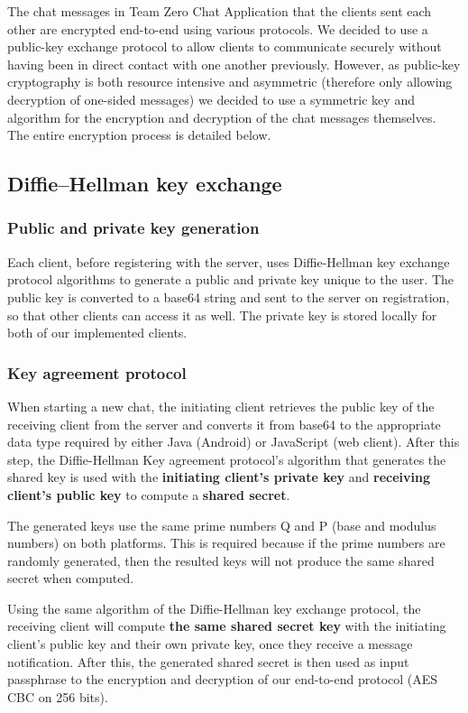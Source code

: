 The chat messages in Team Zero Chat Application that the clients sent each other are encrypted end-to-end using various protocols. We decided to use a public-key exchange protocol to allow clients to communicate securely without having been in direct contact with one another previously. However, as public-key cryptography is both resource intensive and asymmetric (therefore only allowing decryption of one-sided messages) we decided to use a symmetric key and algorithm for the encryption and decryption of the chat messages themselves. The entire encryption process is detailed below.

\subsection{Diffie–Hellman key exchange}

\subsubsection{Public and private key generation}

Each client, before registering with the server, uses Diffie-Hellman key exchange protocol algorithms to generate a public and private key unique to the user\cite{rfc2631}. The public key is converted to a base64 string and sent to the server on registration, so that other clients can access it as well. The private key is stored locally for both of our implemented clients.

\subsubsection{Key agreement protocol}

When starting a new chat, the initiating client retrieves the public key of the receiving client from the server and converts it from base64 to the appropriate data type required by either Java (Android) or JavaScript (web client). After this step, the Diffie-Hellman Key agreement protocol's algorithm that generates the shared key\cite{rfc2631} is used with the \textbf{initiating client's private key} and \textbf{receiving client's public key} to compute a \textbf{shared secret}.

The generated keys use the same prime numbers Q and P (base and modulus numbers) on both platforms. This is required because if the prime numbers are randomly generated, then the resulted keys will not produce the same shared secret when computed.

Using the same algorithm of the Diffie-Hellman key exchange protocol, the receiving client will compute \textbf{the same shared secret key} with the initiating client's public key and their own private key, once they receive a message notification. After this, the generated shared secret is then used as input passphrase to the encryption and decryption of our end-to-end protocol (AES CBC on 256 bits).

